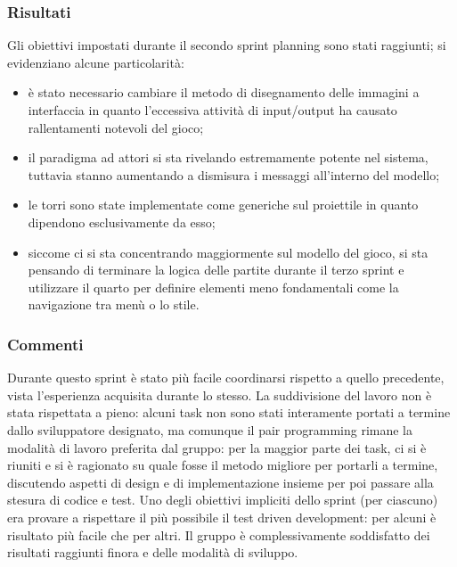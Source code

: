 \subsubsection{Risultati}
Gli obiettivi impostati durante il secondo sprint planning sono stati raggiunti; si evidenziano alcune particolarità:
\begin{itemize}
    \item è stato necessario cambiare il metodo di disegnamento delle immagini a interfaccia in quanto l'eccessiva attività di input/output ha causato rallentamenti notevoli del gioco;
    \item il paradigma ad attori si sta rivelando estremamente potente nel sistema, tuttavia stanno aumentando a dismisura i messaggi all'interno del modello;
    \item le torri sono state implementate come generiche sul proiettile in quanto dipendono esclusivamente da esso;
    \item siccome ci si sta concentrando maggiormente sul modello del gioco, si sta pensando di terminare la logica delle partite durante il terzo sprint e utilizzare il quarto per definire elementi meno fondamentali come la navigazione tra menù o lo stile.
\end{itemize}

\subsubsection{Commenti}
Durante questo sprint è stato più facile coordinarsi rispetto a quello precedente, vista l'esperienza acquisita durante
lo stesso. La suddivisione del lavoro non è stata rispettata a pieno: alcuni task non sono stati interamente portati a
termine dallo sviluppatore designato, ma comunque il pair programming rimane la modalità di lavoro preferita dal gruppo:
per la maggior parte dei task, ci si è riuniti e si è ragionato su quale fosse il metodo migliore per portarli a
termine, discutendo aspetti di design e di implementazione insieme per poi passare alla stesura di codice e test. Uno
degli obiettivi impliciti dello sprint (per ciascuno) era provare a rispettare il più possibile il test driven
development: per alcuni è risultato più facile che per altri. Il gruppo è complessivamente soddisfatto dei risultati
raggiunti finora e delle modalità di sviluppo.

\newpage
